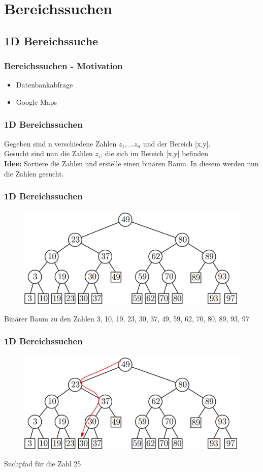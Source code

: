 \section{Bereichssuchen}
\subsection{1D Bereichssuche}
\begin{frame}
	\frametitle{Bereichssuchen - Motivation}
	\begin{itemize}
		\item Datenbankabfrage
		\item Google Maps
	\end{itemize}
\end{frame}

\begin{frame}
	\frametitle{1D Bereichssuchen}
	Gegeben sind n verschiedene Zahlen $z_1, ... z_n$ und der Bereich [x,y].\\
	Gesucht sind nun die Zahlen $z_i$, die sich im Bereich [x,y] befinden \\
	\pause
	\textbf{Idee:} Sortiere die Zahlen und erstelle einen binären Baum. In diesem werden nun die Zahlen gesucht.
\end{frame}

\begin{frame}
	\frametitle{{1D Bereichssuchen}}
	\begin{figure}[htbp]
		\begin{center}
	  	\includegraphics[width=.8\linewidth]{bilder/1d}
		\end{center}
	\end{figure}
	Binärer Baum zu den Zahlen 3, 10, 19, 23, 30, 37, 49, 59, 62, 70, 80, 89, 93, 97
\end{frame}

\begin{frame}
	\frametitle{{1D Bereichssuchen}}
\begin{figure}[htbp]
	\begin{center}
  	\includegraphics[width=.8\linewidth]{bilder/1d2}
	\end{center}
\end{figure}
Suchpfad für die Zahl 25
\end{frame}


